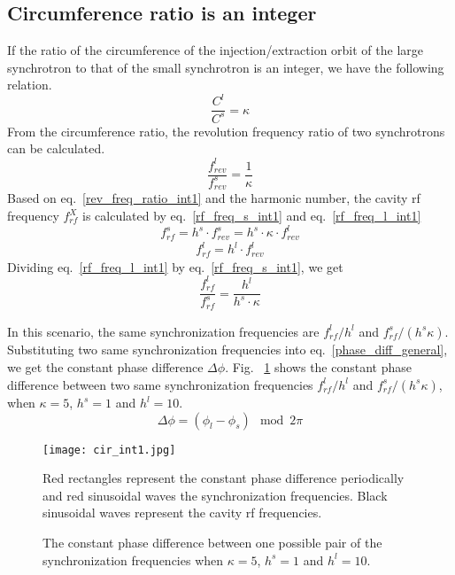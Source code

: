 \subsection{Circumference ratio is an integer}
\label{sec:cir_integer}
If the ratio of the circumference of the injection/extraction orbit of the large synchrotron to that of the small synchrotron is an integer, we have the following relation. 
\begin{equation}
\frac{C^l}{C^s}=\kappa \label{circumference_ratio_int1}
\end{equation}
From the circumference ratio, the revolution frequency ratio of two synchrotrons can be calculated.
\begin{equation}
\frac{f_{\mathit{rev}}^{l}}{f_{\mathit{rev}}^{s}}=\frac{1}{\kappa} \label{rev_freq_ratio_int1}
\end{equation}
Based on eq.~\ref{rev_freq_ratio_int1} and the harmonic number, the cavity rf frequency $f_{rf}^{X}$ is calculated by eq.~\ref{rf_freq_s_int1} and eq.~\ref{rf_freq_l_int1}
\begin{equation} 
f_{\mathit{rf}}^{s}= h^s \cdot f_{\mathit{rev}}^{s}=h^s \cdot \kappa \cdot f_{rev}^{l} \label{rf_freq_s_int1}
\end{equation}
\begin{equation} 
f_{\mathit{rf}}^{l}= h^l \cdot f_{\mathit{rev}}^{l} \label{rf_freq_l_int1}
\end{equation}
Dividing eq.~\ref{rf_freq_l_int1} by eq.~\ref{rf_freq_s_int1}, we get
\begin{equation} 
\frac{f_{\mathit{rf}}^{l}}{f_{\mathit{rf}}^{s}}= \frac{h^l}{h^s \cdot \kappa} \label{rf_freq_ratio1}
\end{equation}

In this scenario, the same synchronization frequencies are $f_{\mathit{rf}}^{l}/h^l $ and $f_{\mathit{rf}}^{s}/(h^{s}\kappa)$. Substituting two same synchronization frequencies into eq.~\ref{phase_diff_general}, we get the constant phase difference $\Delta \phi$. Fig. ~\ref{cir_int1} shows the constant phase difference between two same synchronization frequencies $f_{\mathit{rf}}^{l}/h^l $ and $f_{\mathit{rf}}^{s}/(h^{s}\kappa)$, when $\kappa=5$, $h^s=1$ and $h^l=10$.
\begin{equation}
\label{phase_diff_cir_int}
	\Delta \phi=(\phi_l-\phi_s) \mod 2\pi
\end{equation}

\begin{figure}[!htb]
   \centering   
   \texttt{[image: cir\_int1.jpg]}
   \caption{The constant phase difference between one possible pair of the synchronization frequencies when $\kappa=5$, $h^s=1$ and $h^l=10$. }{Red rectangles represent the constant phase difference periodically and red sinusoidal waves the synchronization frequencies. Black sinusoidal waves represent the cavity rf frequencies. }
   \label{cir_int1}
\end{figure} 

